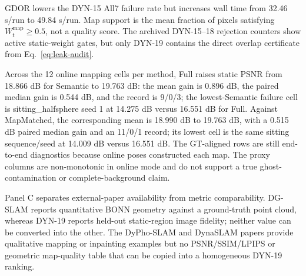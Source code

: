 \begin{table}[t]
\vspace{0.6ex}
\end{table}

GDOR lowers the DYN-15 All7 failure rate but increases wall time from 32.46 s/run to 49.84 s/run.
Map support is the mean fraction of pixels satisfying $W_t^{\mathrm{map}}\ge0.5$, not a quality score.
The archived DYN-15--18 rejection counters show active static-weight gates, but only DYN-19 contains the direct overlap certificate from Eq.~\eqref{eq:leak-audit}.

Across the 12 online mapping cells per method, Full raises static PSNR from 18.866 dB for Semantic to 19.763 dB: the mean gain is 0.896 dB, the paired median gain is 0.544 dB, and the record is 9/0/3; the lowest-Semantic failure cell is sitting\_halfsphere seed 1 at 14.275 dB versus 16.551 dB for Full.
Against MapMatched, the corresponding mean is 18.990 dB to 19.763 dB, with a 0.515 dB paired median gain and an 11/0/1 record; its lowest cell is the same sitting sequence/seed at 14.009 dB versus 16.551 dB.
The GT-aligned rows are still end-to-end diagnostics because online poses constructed each map.
The proxy columns are non-monotonic in online mode and do not support a true ghost-contamination or complete-background claim.

Panel C separates external-paper availability from metric comparability.
DG-SLAM reports quantitative BONN geometry against a ground-truth point cloud, whereas DYN-19 reports held-out static-region image fidelity; neither value can be converted into the other.
The DyPho-SLAM and DynaSLAM papers provide qualitative mapping or inpainting examples but no PSNR/SSIM/LPIPS or geometric map-quality table that can be copied into a homogeneous DYN-19 ranking.


